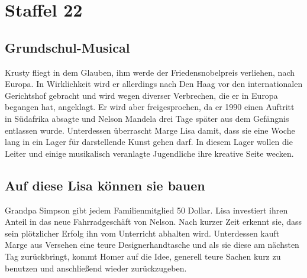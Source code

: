 
\section{Staffel 22}

\subsection{Grundschul-Musical}\label{MABF21}
Krusty fliegt in dem Glauben, ihm werde der Friedensnobelpreis verliehen, nach Europa. In Wirklichkeit wird er allerdings nach Den Haag vor den internationalen Gerichtshof gebracht und wird wegen diverser Verbrechen, die er in Europa begangen hat, angeklagt. Er wird aber freigesprochen, da er 1990 einen Auftritt in Südafrika absagte und Nelson Mandela drei Tage später aus dem Gefängnis entlassen wurde. Unterdessen überrascht Marge Lisa damit, dass sie eine Woche lang in ein Lager für darstellende Kunst gehen darf. In diesem Lager wollen die Leiter und einige musikalisch veranlagte Jugendliche ihre kreative Seite wecken.


\subsection{Auf diese Lisa können sie bauen}\label{MABF17}
Grandpa Simpson gibt jedem Familienmitglied 50 Dollar. Lisa investiert ihren Anteil in das neue Fahrradgeschäft von Nelson. Nach kurzer Zeit erkennt sie, dass sein plötzlicher Erfolg ihn vom Unterricht abhalten wird. Unterdessen kauft Marge aus Versehen eine teure Designerhandtasche und als sie diese am nächsten Tag zurückbringt, kommt Homer auf die Idee, generell teure Sachen kurz zu benutzen und anschließend wieder zurückzugeben.

